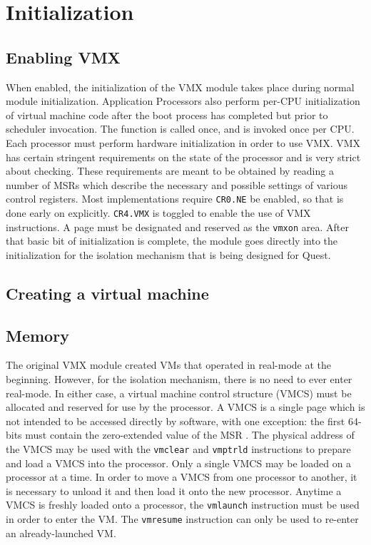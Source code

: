 \documentclass[twocolumn]{article}
\newcommand\func[1]{{\path {#1}}}
\newcommand\MSR[1]{{\path {#1}}}
\newcommand\bit[2]{{\tt {#1}.{#2}}}
\newcommand\inst[1]{{\tt {#1}}}
\begin{document}
\section{Initialization}
\subsection{Enabling VMX}
When enabled, the initialization of the VMX module takes place during
normal module initialization.  Application Processors also perform
per-CPU initialization of virtual machine code after the boot process
has completed but prior to scheduler invocation.  The function
\func{vmx_global_init} is called once, and \func{vmx_processor_init}
is invoked once per CPU.  Each processor must perform hardware
initialization in order to use VMX. VMX has certain stringent
requirements on the state of the processor and is very strict about
checking.  These requirements are meant to be obtained by reading a
number of MSRs which describe the necessary and possible settings of
various control registers.  Most implementations require \bit{CR0}{NE}
be enabled, so that is done early on explicitly.  \bit{CR4}{VMX} is
toggled to enable the use of VMX instructions.  A page must be
designated and reserved as the \inst{vmxon} area.  After that basic
bit of initialization is complete, the module goes directly into the
initialization for the isolation mechanism that is being designed for
Quest.

\subsection{Creating a virtual machine}
\subsection{Memory}
The original VMX module created VMs that operated in real-mode at the
beginning.  However, for the isolation mechanism, there is no need to
ever enter real-mode.  In either case, a virtual machine control
structure (VMCS) must be allocated and reserved for use by the
processor.  A VMCS is a single page which is not intended to be
accessed directly by software, with one exception: the first 64-bits
must contain the zero-extended value of the MSR \MSR{IA32_VMX_BASIC}.
The physical address of the VMCS may be used with the \inst{vmclear}
and \inst{vmptrld} instructions to prepare and load a VMCS into the
processor.  Only a single VMCS may be loaded on a processor at a time.
In order to move a VMCS from one processor to another, it is necessary
to unload it and then load it onto the new processor.  Anytime a VMCS
is freshly loaded onto a processor, the \inst{vmlaunch} instruction
must be used in order to enter the VM.  The \inst{vmresume}
instruction can only be used to re-enter an already-launched VM.
\end{document}
